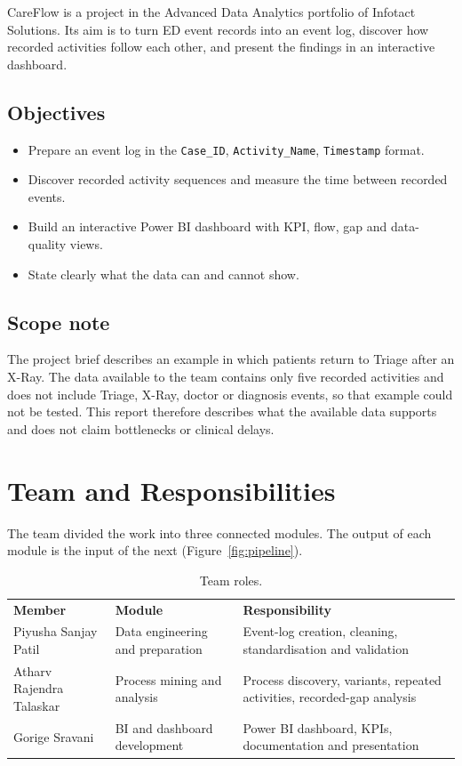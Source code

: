 \documentclass[11pt,a4paper]{article}
\newcommand{\tablehead}[1]{\color{white}\sffamily\bfseries #1}
\begin{document}
CareFlow is a project in the Advanced Data Analytics portfolio of Infotact Solutions. Its aim is to turn ED event records into an event log, discover how recorded activities follow each other, and present the findings in an interactive dashboard.

\subsection{Objectives}
\begin{itemize}
  \item Prepare an event log in the \texttt{Case\_ID}, \texttt{Activity\_Name}, \texttt{Timestamp} format.
  \item Discover recorded activity sequences and measure the time between recorded events.
  \item Build an interactive Power BI dashboard with KPI, flow, gap and data-quality views.
  \item State clearly what the data can and cannot show.
\end{itemize}

\subsection{Scope note}
\begin{warnbox}[title=Scope of the available data]
The project brief describes an example in which patients return to Triage after an X-Ray. The data available to the team contains only five recorded activities and does not include Triage, X-Ray, doctor or diagnosis events, so that example could not be tested. This report therefore describes what the available data supports and does not claim bottlenecks or clinical delays.
\end{warnbox}

\section{Team and Responsibilities}
The team divided the work into three connected modules. The output of each module is the input of the next (Figure~\ref{fig:pipeline}).

\begin{table}[H]
\centering
\begin{tabularx}{\textwidth}{L{3.6cm}L{4.2cm}Y}
\tablehead{Member} & \tablehead{Module} & \tablehead{Responsibility}\\
Piyusha Sanjay Patil & Data engineering and preparation & Event-log creation, cleaning, standardisation and validation\\
Atharv Rajendra Talaskar & Process mining and analysis & Process discovery, variants, repeated activities, recorded-gap analysis\\
Gorige Sravani & BI and dashboard development & Power BI dashboard, KPIs, documentation and presentation\\
\end{tabularx}
\caption{Team roles.}
\end{table}
\end{document}
